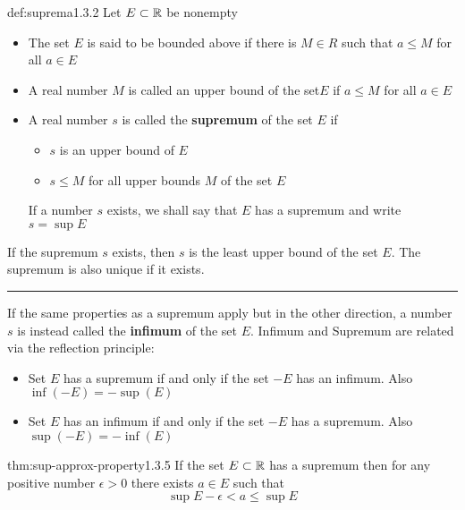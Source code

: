 \documentclass[landscape, 8pt]{extarticle}
\begin{document}
\begin{multicols}{3}
\begin{dfn}{def:suprema}{1.3.2}
Let $E \subset \mathbb{R}$ be nonempty
\vspace{-5pt}
\renewcommand\labelitemi{\tiny$\bullet$}
\begin{itemize}
    \setlength\itemsep{0em}
    \item The set $E$ is said to be bounded above if there is $M\in R$ such that $a\le M$ for all $a\in E$
    \item A real number $M$ is called an upper bound of the set$E$ if $a\le M$ for all $a\in E$
    \item A real number $s$ is called the \textbf{supremum} of the set $E$ if 
    \vspace{-5pt}
    \renewcommand\labelitemi{\tiny$\bullet$}
    \begin{itemize}
        \setlength\itemsep{0em}
        \item $s$ is an upper bound of $E$
        \item $s\le M$ for all upper bounds $M$ of the set $E$
    \end{itemize}
    \vspace{-5pt}
    If a number $s$ exists, we shall say that $E$ has a supremum and write $s=\sup E$
\end{itemize}
If the supremum $s$ exists, then $s$ is the least upper bound of the set $E$. The supremum is also unique if it exists.
\vspace{3pt}
\hrule
\vspace{3pt}
\noindent If the same properties as a supremum apply but in the other direction, a number $s$ is instead called the \textbf{infimum} of the set $E$. Infimum and Supremum are related via the reflection principle:
\vspace{-5pt}
\renewcommand\labelitemi{\tiny$\bullet$}
\begin{itemize}
    \setlength\itemsep{0em}
    \item Set $E$ has a supremum if and only if the set $-E$ has an infimum. Also $\inf (-E) = -\sup(E)$
    \item Set $E$ has an infimum if and only if the set $-E$ has a supremum. Also $\sup (-E) = -\inf(E)$
\end{itemize}
\end{dfn}
\vspace{-5pt}

\begin{thm}{thm:sup-approx-property}{1.3.5}
If the set $E \subset \mathbb{R}$ has a supremum then for any positive number $\epsilon > 0$ there exists $a \in E$ such that
\[\sup E - \epsilon < a \le \sup E\]
\end{thm}
\vspace{-5pt}


\end{multicols}
\end{document}
